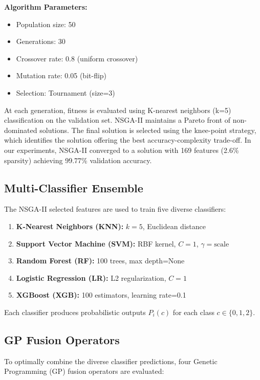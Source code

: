 \documentclass{article}
\begin{document}
\textbf{Algorithm Parameters:}
\begin{itemize}
	\item Population size: 50
	\item Generations: 30
	\item Crossover rate: 0.8 (uniform crossover)
	\item Mutation rate: 0.05 (bit-flip)
	\item Selection: Tournament (size=3)
\end{itemize}

At each generation, fitness is evaluated using K-nearest neighbors (k=5) classification on the validation set. NSGA-II maintains a Pareto front of non-dominated solutions. The final solution is selected using the knee-point strategy, which identifies the solution offering the best accuracy-complexity trade-off. In our experiments, NSGA-II converged to a solution with 169 features (2.6\% sparsity) achieving 99.77\% validation accuracy.

\subsection{Multi-Classifier Ensemble}

The NSGA-II selected features are used to train five diverse classifiers:
\begin{enumerate}
	\item \textbf{K-Nearest Neighbors (KNN):} $k=5$, Euclidean distance
	\item \textbf{Support Vector Machine (SVM):} RBF kernel, $C=1$, $\gamma=\text{scale}$
	\item \textbf{Random Forest (RF):} 100 trees, max depth=None
	\item \textbf{Logistic Regression (LR):} L2 regularization, $C=1$
	\item \textbf{XGBoost (XGB):} 100 estimators, learning rate=0.1
\end{enumerate}

Each classifier produces probabilistic outputs $P_i(c)$ for each class $c \in \{0, 1, 2\}$.

\subsection{GP Fusion Operators}

To optimally combine the diverse classifier predictions, four Genetic Programming (GP) fusion operators are evaluated:
\end{document}
